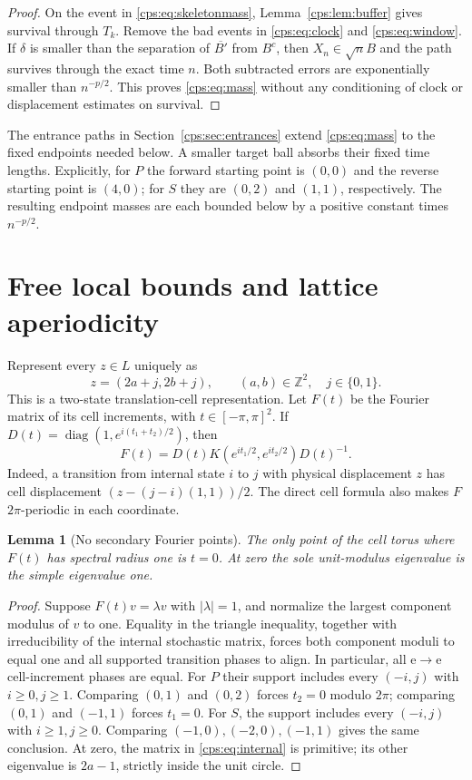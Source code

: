 \documentclass[11pt,letterpaper]{article}
\numberwithin{equation}{section}
\newtheorem{lemma}[theorem]{Lemma}
\theoremstyle{remark}\newtheorem{remark}[theorem]{Remark}
\newcommand{\ZZ}{\mathbb Z}
\newcommand{\diag}{\operatorname{diag}}
\newcommand{\e}{\mathrm e}
\begin{document}
\begin{proof}
On the event in \eqref{cps:eq:skeletonmass}, Lemma~\ref{cps:lem:buffer} gives survival through $T_k$. Remove the bad events in \eqref{cps:eq:clock} and \eqref{cps:eq:window}. If $\delta$ is smaller than the separation of $\overline{B'}$ from $B^c$, then $X_n\in\sqrt nB$ and the path survives through the exact time $n$. Both subtracted errors are exponentially smaller than $n^{-p/2}$. This proves \eqref{cps:eq:mass} without any conditioning of clock or displacement estimates on survival.
\end{proof}
The entrance paths in Section~\ref{cps:sec:entrances} extend \eqref{cps:eq:mass} to the fixed endpoints needed below. A smaller target ball absorbs their fixed time lengths. Explicitly, for $P$ the forward starting point is $(0,0)$ and the reverse starting point is $(4,0)$; for $S$ they are $(0,2)$ and $(1,1)$, respectively. The resulting endpoint masses are each bounded below by a positive constant times $n^{-p/2}$.

\section{Free local bounds and lattice aperiodicity}\label{cps:sec:Fourier}
Represent every $z\in L$ uniquely as
\begin{equation}
 z=(2a+j,2b+j),\qquad(a,b)\in\ZZ^2,\quad j\in\{0,1\}.
\end{equation}
This is a two-state translation-cell representation. Let $F(t)$ be the Fourier matrix of its cell increments, with $t\in[-\pi,\pi]^2$. If
$D(t)=\diag(1,e^{i(t_1+t_2)/2})$, then
\begin{equation}\label{cps:eq:cellFourier}
 F(t)=D(t)K(e^{it_1/2},e^{it_2/2})D(t)^{-1}.
\end{equation}
Indeed, a transition from internal state $i$ to $j$ with physical displacement $z$ has cell displacement $(z-(j-i)(1,1))/2$. The direct cell formula also makes $F$ $2\pi$-periodic in each coordinate.

\begin{lemma}[No secondary Fourier points]\label{cps:lem:aperiodic}
The only point of the cell torus where $F(t)$ has spectral radius one is $t=0$. At zero the sole unit-modulus eigenvalue is the simple eigenvalue one.
\end{lemma}
\begin{proof}
Suppose $F(t)v=\lambda v$ with $|\lambda|=1$, and normalize the largest component modulus of $v$ to one. Equality in the triangle inequality, together with irreducibility of the internal stochastic matrix, forces both component moduli to equal one and all supported transition phases to align. In particular, all $\e\to\e$ cell-increment phases are equal. For $P$ their support includes every $(-i,j)$ with $i\ge0,j\ge1$. Comparing $(0,1)$ and $(0,2)$ forces $t_2=0$ modulo $2\pi$; comparing $(0,1)$ and $(-1,1)$ forces $t_1=0$. For $S$, the support includes every $(-i,j)$ with $i\ge1,j\ge0$. Comparing $(-1,0),(-2,0),(-1,1)$ gives the same conclusion. At zero, the matrix in \eqref{cps:eq:internal} is primitive; its other eigenvalue is $2a-1$, strictly inside the unit circle.
\end{proof}
\end{document}
